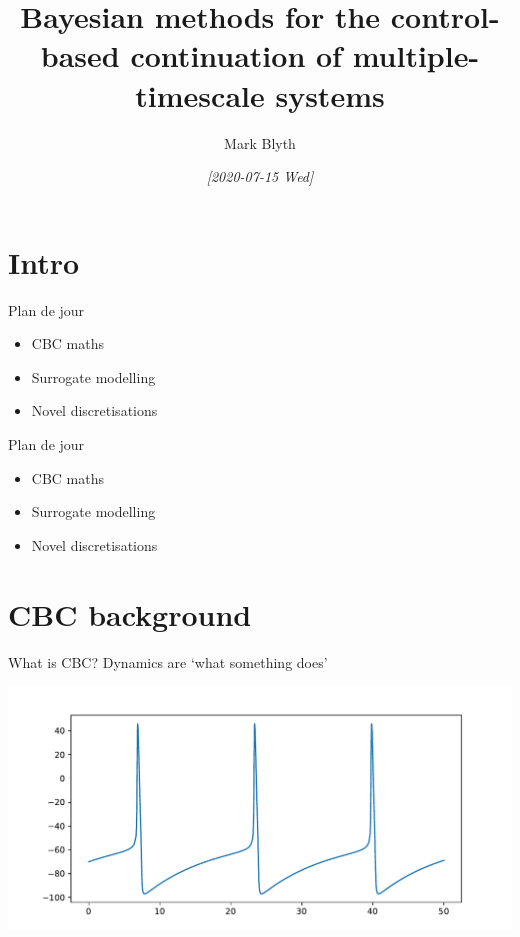 \documentclass[presentation]{beamer}
\author{Mark Blyth}
\date{\textit{[2020-07-15 Wed]}}
\title{Bayesian methods for the control-based continuation of multiple-timescale systems}
\begin{document}
\maketitle

\section{Intro}
\label{sec:orgfd158cb}
\begin{frame}[label={sec:org4db2d50}]{Plan de jour}
\begin{itemize}
\item CBC maths
\item Surrogate modelling
\item Novel discretisations
\end{itemize}
\end{frame}
\begin{frame}[label={sec:orga1cbe38}]{Plan de jour}
\begin{itemize}
\item \alert{CBC maths}
\item Surrogate modelling
\item Novel discretisations
\end{itemize}
\end{frame}
\section{CBC background}
\label{sec:org0af6836}
\begin{frame}[label={sec:org33938b2}]{What is CBC?}
Dynamics are `what something does'

\begin{center}
\includegraphics[width=.9\linewidth]{./HH.pdf}
\end{center}
\end{frame}
\end{document}
